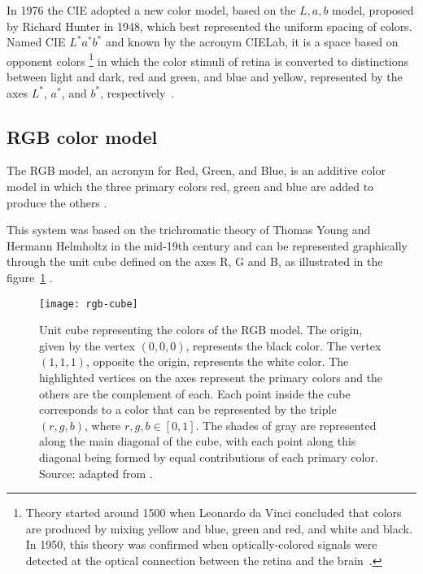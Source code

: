 In 1976 the CIE adopted a new color model, based on the $L, a, b$ model, proposed by Richard Hunter in 1948, which best represented the uniform spacing of colors. Named CIE $L^*a^*b^*$ and known by the acronym CIELab, it is a space based on opponent colors \footnote{Theory started around 1500 when Leonardo da Vinci concluded that colors are produced by mixing yellow and blue, green and red, and white and black. In 1950, this theory was confirmed when optically-colored signals were detected at the optical connection between the retina and the brain~\citep{gevers:12}.} in which the color stimuli of retina is converted to distinctions between light and dark, red and green, and blue and yellow, represented by the axes $L^*$, $a^*$, and $b^*$, respectively~\citep{gevers:12}.


\subsection{RGB color model}
\label{sec:modelo_cores_rgb}

The RGB model, an acronym for Red, Green, and Blue, is an additive color model in which the three primary colors red, green and blue are added to produce the others \citep{gonzalez:02}.

This system was based on the trichromatic theory of Thomas Young and Hermann Helmholtz in the mid-19th century and can be represented graphically
through the unit cube defined on the axes R, G and B, as illustrated in the figure~\ref{fig:rgb-cube} \citep{konstantinos:00}.

\begin{figure}[!ht]
  \centering
  \texttt{[image: rgb-cube]}
  \caption[Unit cube representing the colors of the RGB model]{Unit cube representing the colors of the RGB model. The origin, given by the vertex $(0, 0, 0)$, represents the black color. The vertex $(1, 1, 1)$, opposite the origin, represents the white color. The highlighted vertices on the axes represent the primary colors and the others are the complement of each. Each point inside the cube corresponds to a color that can be represented by the triple $(r, g, b)$, where $r, g, b \in [0, 1]$. The shades of gray are represented along the main diagonal of the cube, with each point along this diagonal being formed by equal contributions of each primary color. Source: adapted from \citet{gonzalez:02}.}
  \label{fig:rgb-cube} 
\end{figure}


